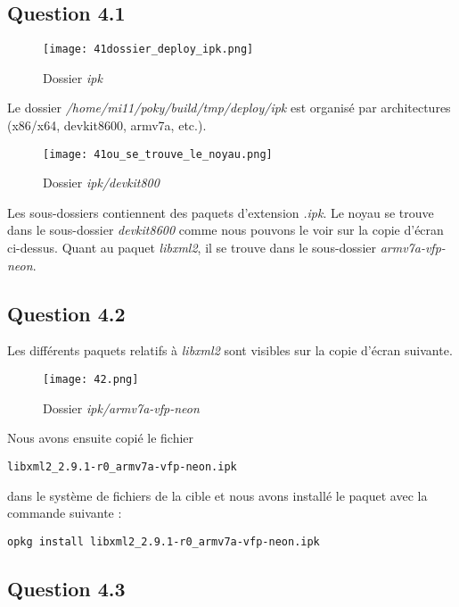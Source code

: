 \documentclass[a4paper,12pt]{report}
\begin{document}
\subsection{Question 4.1}

\begin{figure}[h]
	\centering
		\texttt{[image: 41dossier\_deploy\_ipk.png]}
		\caption{Dossier \textit{ipk}}
\end{figure}

Le dossier \textit{/home/mi11/poky/build/tmp/deploy/ipk} est organisé par architectures (x86/x64, devkit8600, armv7a, etc.).

\newpage

\begin{figure}[h]
	\centering
		\texttt{[image: 41ou\_se\_trouve\_le\_noyau.png]}
		\caption{Dossier \textit{ipk/devkit800}}
\end{figure}

Les sous-dossiers contiennent des paquets d'extension \textit{.ipk}. Le noyau se trouve dans le sous-dossier \textit{devkit8600} comme nous pouvons le voir sur la copie d'écran ci-dessus. Quant au paquet \textit{libxml2}, il se trouve dans le sous-dossier \textit{armv7a-vfp-neon}.

\newpage

\subsection{Question 4.2}

Les différents paquets relatifs à \textit{libxml2} sont visibles sur la copie d'écran suivante.

\begin{figure}[h]
	\centering
		\texttt{[image: 42.png]}
		\caption{Dossier \textit{ipk/armv7a-vfp-neon}}
\end{figure}

Nous avons ensuite copié le fichier 
\begin{verbatim}
libxml2_2.9.1-r0_armv7a-vfp-neon.ipk 
\end{verbatim}
dans le système de fichiers de la cible et nous avons installé le paquet avec la commande suivante : 
\begin{verbatim}
opkg install libxml2_2.9.1-r0_armv7a-vfp-neon.ipk
\end{verbatim}


\subsection{Question 4.3}
\end{document}
